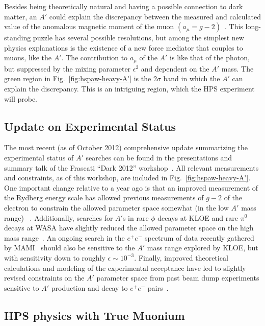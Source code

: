 Besides being theoretically natural and having a possible connection to dark matter, an $A'$ could explain the discrepancy between the measured and 
calculated value of the anomalous magnetic moment of the muon $(a_\mu=g-2)$~\cite{Pospelov:2008zw}.  
This long-standing puzzle has several possible resolutions, but among the simplest new physics explanations
is the existence of a new force mediator that couples to muons, like the $A'$.  The contribution to $a_\mu$ of the $A'$ 
is like that of the photon, but suppressed by the mixing parameter $\epsilon^2$ and dependent on the $A'$ mass.  
The green region in Fig.~\ref{fig:hspaw-heavy-A'} is the 2$\sigma$ band in which the $A'$ can 
explain the discrepancy.  This is an intriguing region, which the HPS experiment will probe.  

\subsection{Update on Experimental Status}

The most recent (as of October 2012) comprehensive update summarizing the experimental status of $A'$ searches 
can be found in the presentations and summary talk of the Frascati ``Dark 2012'' workshop~\cite{Dark2012}.
All relevant measurements and constraints, as of this workshop, are included in Fig.~\ref{fig:hspaw-heavy-A'}.
One important change relative to a year ago is that an improved measurement of the Rydberg energy scale 
has allowed previous measurements of $g-2$ of the electron to constrain the allowed parameter space somewhat (in the low $A'$ mass range)
~\cite{endo:g2e,Davoudiasl:2012ig}.  
Additionally, searches for $A'$s in rare $\phi$ decays at KLOE and rare $\pi^0$ decays at WASA have slightly reduced 
the allowed parameter space on the high mass range~\cite{rarek}. 
An ongoing search in the $e^+e^-$ spectrum of data recently gathered by MAMI~\cite{Merkel:2011ze} should also 
be sensitive to the $A'$ mass range explored by KLOE, but with sensitivity down to roughly $\epsilon\sim 10^{-3}$. 
Finally, improved theoretical calculations and modeling of the experimental acceptance have led to slightly revised constraints on the 
$A'$ parameter space from past beam dump experiments sensitive to $A'$ production and decay to $e^+e^-$ pairs~\cite{andreas}.

\subsection{HPS physics with True Muonium}

